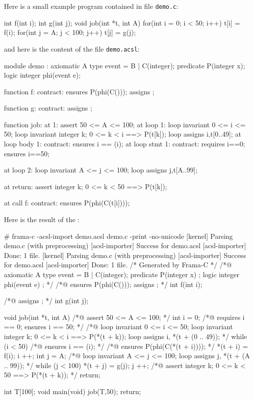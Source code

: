 \documentclass{frama-c-book}
\begin{document}
Here is a small example \C program contained in file \verb|demo.c|:
\begin{shell}
int f(int i);
int g(int j);
void job(int *t, int A) {
  for(int i = 0; i < 50; i++) t[i] = f(i);
  for(int j = A; j < 100; j++) t[j] = g(j);
}
\end{shell}
and here is the content of the file \verb|demo.acsl|:
\begin{shell}
module demo :
 axiomatic A {
 type event = B | C(integer);
 predicate P(integer x);
 logic integer phi(event e);
 }

 function f:
contract:
  ensures P(phi(C(\result)));
  assigns \nothing;

function g:
contract: assigns \nothing;

function job:
at 1: assert 50 <= A <= 100;
at loop 1:
  loop invariant 0 <= i <= 50;
  loop invariant \forall integer k; 0 <= k < i ==> P(t[k]);
  loop assigns i,t[0..49];
at loop body 1:
  contract:
    ensures i == \old(i);
at loop stmt 1:
  contract:
    requires i==0;
    ensures  i==50;

at loop 2:
  loop invariant A <= j <= 100;
  loop assigns j,t[A..99];

at return:
  assert \forall integer k; 0 <= k < 50 ==> P(t[k]);

at call f:
  contract:
    ensures P(phi(C(t[i])));
\end{shell}
Here is the result of the \plugin{}:
\begin{shell}
# frama-c -acsl-import demo.acsl demo.c -print -no-unicode
[kernel] Parsing demo.c (with preprocessing)
[acsl-importer] Success for demo.acsl
[acsl-importer] Done: 1 file.
[kernel] Parsing demo.c (with preprocessing)
[acsl-importer] Success for demo.acsl
[acsl-importer] Done: 1 file.
/* Generated by Frama-C */
/*@
axiomatic A {
  type event = B | C(integer);
  predicate P(integer x) ;
  logic integer phi(event e) ;
  }
 */
/*@ ensures P(phi(C(\result)));
    assigns \nothing; */
int f(int i);

/*@ assigns \nothing; */
int g(int j);

void job(int *t, int A) {
  /*@ assert 50 <= A <= 100; */
  {
    int i = 0;
    /*@ requires i == 0;
        ensures i == 50; */
    /*@ loop invariant 0 <= i <= 50;
        loop invariant \forall integer k; 0 <= k < i ==> P(*(t + k));
        loop assigns i, *(t + (0 .. 49));
    */
    while (i < 50) {
      /*@ ensures i == \old(i); */
      {
        /*@ ensures P(phi(C(*(t + i)))); */
        *(t + i) = f(i);
      }
      i ++;
    }
  }
  {
    int j = A;
    /*@ loop invariant A <= j <= 100;
        loop assigns j, *(t + (A .. 99)); */
    while (j < 100) {
      {
        *(t + j) = g(j);
      }
      j ++;
    }
  }
  /*@ assert \forall integer k; 0 <= k < 50 ==> P(*(t + k)); */
  return;
}

int T[100];
void main(void) {
  job(T,50);
  return;
}
\end{shell}
\end{document}
